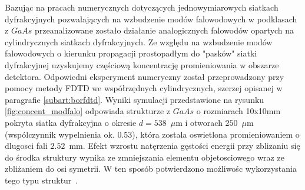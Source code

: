 Bazując na pracach numerycznych dotyczących  jednowymiarowych siatkach dyfrakcyjnych pozwalających na wzbudzenie modów falowodowych w podklasach z $GaAs$ przeanalizowane zostało działanie analogicznych falowodów opartych na cylindrycznych siatkach dyfrakcyjnych. Ze względu na wzbudzenie modów falowodowych o kierunku propagacji prostopadłym do "pasków" siatki dyfrakcyjnej uzyskujemy częściową koncentrację promieniowania w obszarze detektora. Odpowiedni eksperyment numeryczny został przeprowadzony przy pomocy metody FDTD we współrzędnych cylindrycznych, szerzej opisanej w paragrafie \ref{subart:borfdtd}. Wyniki symulacji przedstawione na rysunku \ref{fig:concent_modfalo} odpowiada strukturze z $GaAs$ o rozmiarach 10x10mm pokryta siatka dyfrakcyjna o okresie $d=538$~$\mu$m i otworach $250$~$\mu$m (wspólczynnik wypelnienia ok. 0.53), która zostala oswietlona promieniowaniem o dlugosci fali $2.52$~mm. Efekt wzrostu natęrzenia gęstości energii przy zblizaniu się do środka struktury wynika ze zmniejszania elementu objetosciowego wraz ze zbliżaniem do osi symetrii. W ten sposób potwierdzono możliwośc wykorzystania tego typu struktur~\cite{Stolarek2011}.

